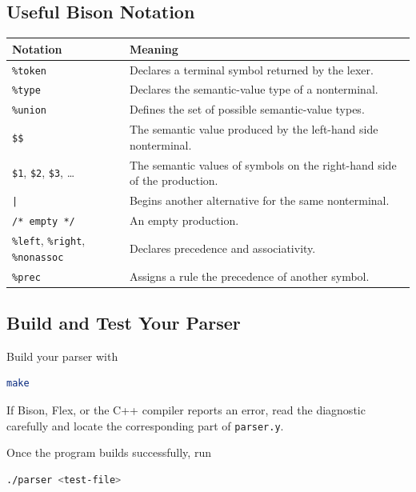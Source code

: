 \documentclass[12pt]{article}
\begin{document}
\newpage

\subsection*{Useful Bison Notation}

\begin{center}
\begin{tabular}{|l|p{12cm}|}
\hline
\textbf{Notation} & \textbf{Meaning} \\
\hline
\texttt{\%token} & Declares a terminal symbol returned by the lexer. \\
\hline
\texttt{\%type} & Declares the semantic-value type of a nonterminal. \\
\hline
\texttt{\%union} & Defines the set of possible semantic-value types. \\
\hline
\texttt{\$\$} & The semantic value produced by the left-hand side nonterminal. \\
\hline
\texttt{\$1}, \texttt{\$2}, \texttt{\$3}, \dots & The semantic values of symbols on the right-hand side of the production. \\
\hline
\texttt{|} & Begins another alternative for the same nonterminal. \\
\hline
\texttt{/* empty */} & An empty production. \\
\hline
\texttt{\%left}, \texttt{\%right}, \texttt{\%nonassoc} & Declares precedence and associativity. \\
\hline
\texttt{\%prec} & Assigns a rule the precedence of another symbol. \\
\hline
\end{tabular}
\end{center}

\subsection*{Build and Test Your Parser}

Build your parser with

\begin{lstlisting}[language=bash]
make
\end{lstlisting}

If Bison, Flex, or the C++ compiler reports an error, read the diagnostic carefully and locate the corresponding part of \texttt{parser.y}.

Once the program builds successfully, run

\begin{lstlisting}[language=bash]
./parser <test-file>
\end{lstlisting}
\end{document}

